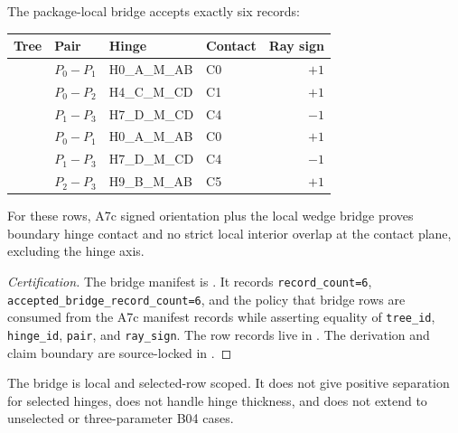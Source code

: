 \begin{certprop}
\label{prop:b04-bridge}
The package-local bridge accepts exactly six records:
\begin{center}
\begin{tabular}{llllr}
\toprule
Tree & Pair & Hinge & Contact & Ray sign\\
\midrule
\treeA{} & \(P_0-P_1\) & H0\_A\_M\_AB & C0 & \(+1\)\\
\treeA{} & \(P_0-P_2\) & H4\_C\_M\_CD & C1 & \(+1\)\\
\treeA{} & \(P_1-P_3\) & H7\_D\_M\_CD & C4 & \(-1\)\\
\treeB{} & \(P_0-P_1\) & H0\_A\_M\_AB & C0 & \(+1\)\\
\treeB{} & \(P_1-P_3\) & H7\_D\_M\_CD & C4 & \(-1\)\\
\treeB{} & \(P_2-P_3\) & H9\_B\_M\_AB & C5 & \(+1\)\\
\bottomrule
\end{tabular}
\end{center}
For these rows, A7c signed orientation plus the local wedge bridge proves
boundary hinge contact and no strict local interior overlap at the contact
plane, excluding the hinge axis.
\end{certprop}

\begin{proof}[Certification]
The bridge manifest is
.  It records
\texttt{record\_count=6}, \texttt{accepted\_bridge\_record\_count=6}, and the
policy that bridge rows are consumed from the A7c manifest records while
asserting equality of \texttt{tree\_id}, \texttt{hinge\_id}, \texttt{pair}, and
\texttt{ray\_sign}.  The row records live in
.  The derivation and
claim boundary are source-locked in
.
\end{proof}

\begin{remark}
The bridge is local and selected-row scoped.  It does not give positive
separation for selected hinges, does not handle hinge thickness, and does not
extend to unselected or three-parameter B04 cases.
\end{remark}
